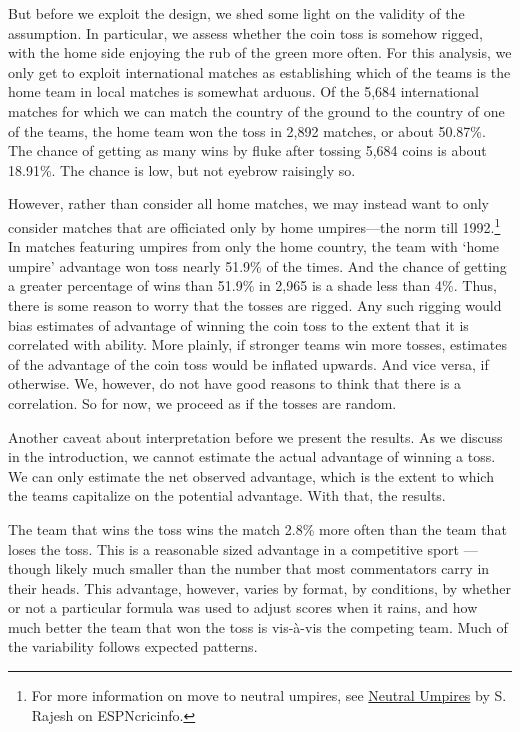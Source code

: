 \documentclass[12pt]{article}
\begin{document}
But before we exploit the design, we shed some light on the validity of the assumption. In particular, we assess whether the coin toss is somehow rigged, with the home side enjoying the rub of the green more often. For this analysis, we only get to exploit international matches as establishing which of the teams is the home team in local matches is somewhat arduous. Of the 5,684 international matches for which we can match the country of the ground to the country of one of the teams, the home team won the toss in 2,892 matches, or about 50.87\%. The chance of getting as many wins by fluke after tossing 5,684 coins is about 18.91\%. The chance is low, but not eyebrow raisingly so. 

However, rather than consider all home matches, we may instead want to only consider matches that are officiated only by home umpires---the norm till 1992.\footnote{For more information on move to neutral umpires, see \href{http://www.espncricinfo.com/magazine/content/story/511175.html}{Neutral Umpires} by S. Rajesh on ESPNcricinfo.} In matches featuring umpires from only the home country, the team with `home umpire' advantage won toss nearly 51.9\% of the times. And the chance of getting a greater percentage of wins than 51.9\% in 2,965 is a shade less than 4\%. Thus, there is some reason to worry that the tosses are rigged. Any such rigging would bias estimates of advantage of winning the coin toss to the extent that it is correlated with ability. More plainly, if stronger teams win more tosses, estimates of the advantage of the coin toss would be inflated upwards. And vice versa, if otherwise. We, however, do not have good reasons to think that there is a correlation. So for now, we proceed as if the tosses are random. 

Another caveat about interpretation before we present the results. As we discuss in the introduction, we cannot estimate the actual advantage of winning a toss. We can only estimate the net observed advantage, which is the extent to which the teams capitalize on the potential advantage. With that, the results.

The team that wins the toss wins the match 2.8\% more often than the team that loses the toss. This is a reasonable sized advantage in a competitive sport --- though likely much smaller than the number that most commentators carry in their heads. This advantage, however, varies by format, by conditions, by whether or not a particular formula was used to adjust scores when it rains, and how much better the team that won the toss is vis-\`{a}-vis the competing team. Much of the variability follows expected patterns.
\end{document}
